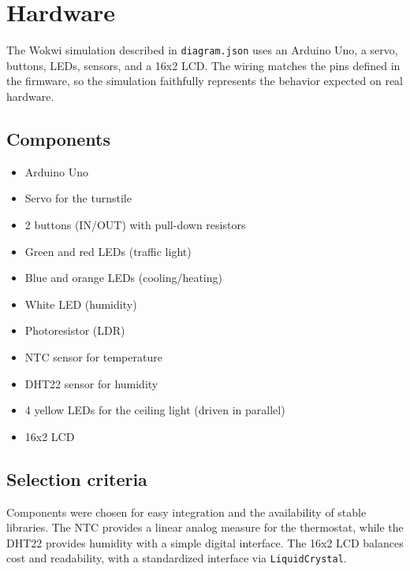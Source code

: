 \chapter{Hardware}

The Wokwi simulation described in \texttt{diagram.json} uses an Arduino Uno, a servo, buttons, LEDs, sensors, and a 16x2 LCD. The wiring matches the pins defined in the firmware, so the simulation faithfully represents the behavior expected on real hardware.

\section{Components}
\begin{itemize}
  \item Arduino Uno
  \item Servo for the turnstile
  \item 2 buttons (IN/OUT) with pull-down resistors
  \item Green and red LEDs (traffic light)
  \item Blue and orange LEDs (cooling/heating)
  \item White LED (humidity)
  \item Photoresistor (LDR)
  \item NTC sensor for temperature
  \item DHT22 sensor for humidity
  \item 4 yellow LEDs for the ceiling light (driven in parallel)
  \item 16x2 LCD
\end{itemize}

\section{Selection criteria}
Components were chosen for easy integration and the availability of stable libraries. The NTC provides a linear analog measure for the thermostat, while the DHT22 provides humidity with a simple digital interface. The 16x2 LCD balances cost and readability, with a standardized interface via \texttt{LiquidCrystal}.

